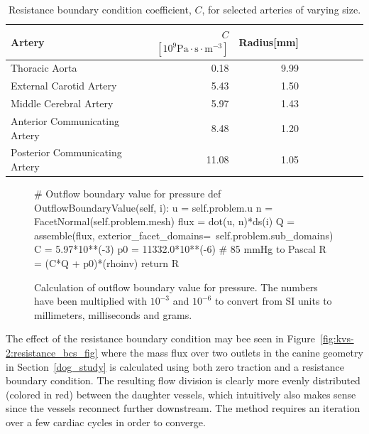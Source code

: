 \begin{table}
  \begin{center}
    \begin{tabular}{l*{7}{r}r}
      Artery & $C$ $ [10^9 \mathrm{Pa} \cdot \mathrm{s}  \cdot \mathrm{m}^{-3}]$ & Radius[mm]\\
      \hline
      Thoracic Aorta			&  0.18 &  	9.99\\
      External Carotid Artery  	& 5.43   &	1.50\\
      Middle Cerebral Artery  	& 5.97   &	1.43\\
      Anterior Communicating Artery  	& 8.48   &	1.20\\
      Posterior Communicating Artery  & 11.08   &	1.05\\
    \end{tabular}
  \end{center}
  \caption{Resistance boundary condition coefficient, $C$,
    for selected arteries of varying size.}
  \label{resistance_coeff}
\end{table}

\begin{figure}
  \begin{center}
    \begin{python}
# Outflow boundary value for pressure
def OutflowBoundaryValue(self, i):
    u = self.problem.u
    n = FacetNormal(self.problem.mesh)
    flux = dot(u, n)*ds(i)
    Q = assemble(flux,
                 exterior_facet_domains=\
                 self.problem.sub_domains)
    C = 5.97*10**(-3)
    p0 = 11332.0*10**(-6) # 85 mmHg to Pascal
    R = (C*Q + p0)*(rhoinv)
    return R

    \end{python}
  \end{center}
    \caption{Calculation of outflow boundary value for pressure. The
    numbers have been multiplied with $10^{-3}$
    and $10^{-6}$ to convert from SI units to millimeters, milliseconds
    and grams.}
    \label{fig:kvs-2:resistance_code}
\end{figure}

The effect of the resistance boundary condition may bee seen in
Figure~\ref{fig:kvs-2:resistance_bcs_fig} where the mass flux over two
outlets in the canine geometry in Section~\ref{dog_study} is
calculated using both zero traction and a resistance boundary
condition. The resulting flow division is clearly more evenly
distributed (colored in red) between the daughter vessels, which
intuitively also makes sense since the vessels reconnect further
downstream. The method requires an iteration over a few cardiac cycles
in order to converge.

